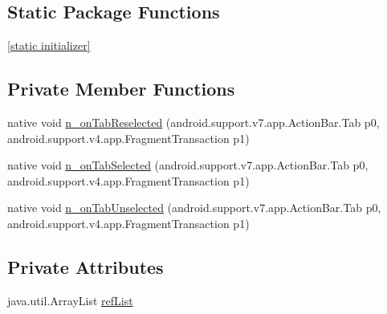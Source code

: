 \subsection*{Static Package Functions}
\begin{CompactItemize}
\item 
\hyperlink{classmono_1_1android_1_1support_1_1v7_1_1app_1_1_action_bar___tab_listener_implementor_24f0dd6f9155af4e993635e2a04f1ef8}{\mbox{[}static initializer\mbox{]}}
\end{CompactItemize}
\subsection*{Private Member Functions}
\begin{CompactItemize}
\item 
native void \hyperlink{classmono_1_1android_1_1support_1_1v7_1_1app_1_1_action_bar___tab_listener_implementor_0a3fa0859b90b223a2b0468045b91a6d}{n\_\-onTabReselected} (android.support.v7.app.ActionBar.Tab p0, android.support.v4.app.FragmentTransaction p1)
\item 
native void \hyperlink{classmono_1_1android_1_1support_1_1v7_1_1app_1_1_action_bar___tab_listener_implementor_06aacdc0d14afecfc6fa582fbf0401c8}{n\_\-onTabSelected} (android.support.v7.app.ActionBar.Tab p0, android.support.v4.app.FragmentTransaction p1)
\item 
native void \hyperlink{classmono_1_1android_1_1support_1_1v7_1_1app_1_1_action_bar___tab_listener_implementor_556a1159676001cd5eeea2d744cd3ad6}{n\_\-onTabUnselected} (android.support.v7.app.ActionBar.Tab p0, android.support.v4.app.FragmentTransaction p1)
\end{CompactItemize}
\subsection*{Private Attributes}
\begin{CompactItemize}
\item 
java.util.ArrayList \hyperlink{classmono_1_1android_1_1support_1_1v7_1_1app_1_1_action_bar___tab_listener_implementor_99a1ad9e192d74080ecd063f146f6c20}{refList}
\end{CompactItemize}


